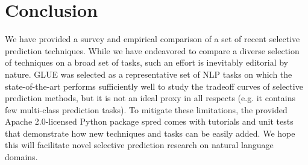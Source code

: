 \documentclass[11pt]{article}
\begin{document}
\section{Conclusion}

We have provided a survey and empirical comparison of a set of recent selective prediction techniques. While we have endeavored to compare a diverse selection of techniques on a broad set of tasks, such an effort is inevitably editorial by nature. GLUE was selected as a representative set of NLP tasks on which the state-of-the-art performs sufficiently well to study the tradeoff curves of selective prediction methods, but it is not an ideal proxy in all respects (e.g. it contains few multi-class prediction tasks). To mitigate these limitations, the provided Apache 2.0-licensed Python package \textsf{spred} comes with tutorials and unit tests that demonstrate how new techniques and tasks can be easily added. We hope this will facilitate novel selective prediction research on natural language domains.










\end{document}
